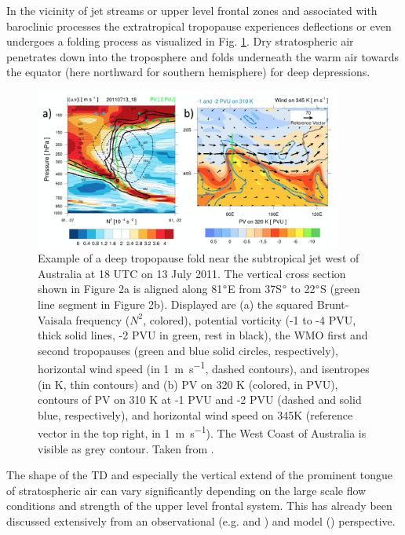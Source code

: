In the vicinity of jet streams or upper level frontal zones and associated with baroclinic processes the extratropical tropopause experiences deflections or even undergoes a folding process as visualized in Fig. \ref{fig:skerlakFold}. Dry stratospheric air penetrates down into the troposphere and folds underneath the warm air towards the equator (here northward for southern hemisphere) for deep depressions. %
%
\begin{figure}[t]
    \centering
    \includegraphics[width=0.9\textwidth]{figures_intro/Skerlak_Fold.png}
    \caption{Example of a deep tropopause fold near the subtropical jet west of Australia at 18 UTC on 13 July 2011. The vertical cross section shown in Figure 2a is aligned along 81$\degree$E from 37S$\degree$ to 22$\degree$S (green line segment in Figure 2b). Displayed are (a) the squared Brunt-Vaisala frequency ($N^2$, colored), potential vorticity (-1 to -4 PVU, thick solid lines, -2 PVU in green, rest in black), the WMO first and second tropopauses (green and blue solid circles, respectively), horizontal wind speed (in \SI{1}{\meter\second^{-1}}, dashed contours), and isentropes (in K, thin contours) and (b) PV on 320 K (colored, in PVU), contours of PV on 310 K at -1 PVU and -2 PVU (dashed and solid blue, respectively), and horizontal wind speed on 345K (reference vector in the top right, in \SI{1}{\meter\second^{-1}}). The West Coast of Australia is visible as grey contour. Taken from \cite{skerlak_tropopause_2015}.}
    \label{fig:skerlakFold}
\end{figure}
%
The shape of the TD and especially the vertical extend of the prominent tongue of stratospheric air can vary significantly depending on the large scale flow conditions and strength of the upper level frontal system. This has already been discussed extensively from an observational (e.g. \cite{shapiro_further_1978} and \cite{keyser_review_1986}) and model (\cite{skerlak_tropopause_2015}) perspective. \\
